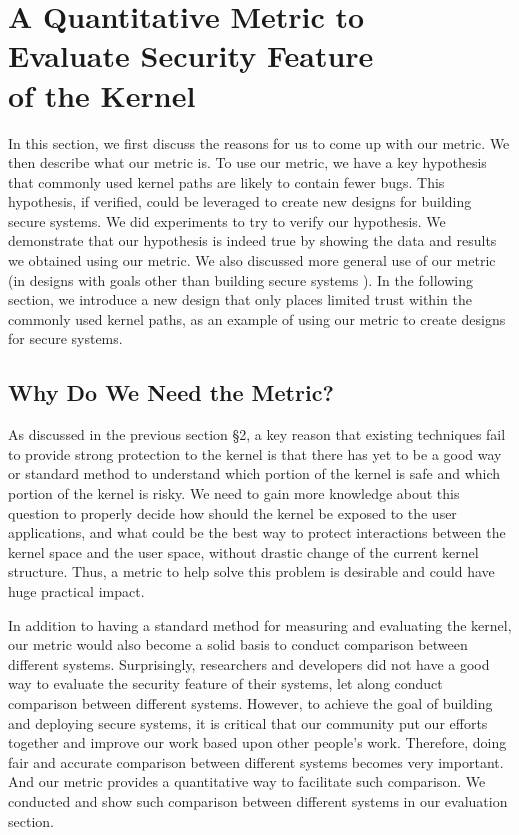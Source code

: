 \section{A Quantitative Metric to \\ Evaluate Security Feature \\ of the Kernel}
\label{sec.metric}
In this section, we first discuss the reasons for us to come up with our metric. 
We then describe what our metric is. To use our metric, we have a key hypothesis that 
commonly used kernel paths are likely to contain fewer bugs. This hypothesis, if verified, 
could be leveraged to create new designs for building secure systems. We did experiments 
to try to verify our hypothesis. We demonstrate that our hypothesis is indeed true by showing 
the data and results we obtained using our metric. We also discussed more general use of 
our metric (in designs with goals other than building secure systems ).
In the following section, we introduce a new design that only places limited trust within 
the commonly used kernel paths, as an example of using our metric to create designs 
for secure systems.

\subsection{Why Do We Need the Metric?}
As discussed in the previous section \S{2}, a key reason that existing techniques 
fail to provide strong protection to the kernel is that there has yet to be a good way 
or standard method to understand which portion of the kernel is safe 
and which portion of the kernel is risky. We need to gain more knowledge about 
this question to properly decide how should the kernel be exposed to the user applications, 
and what could be the best way to protect interactions between the kernel space and 
the user space, without drastic change of the 
current kernel structure. Thus, a metric to help solve this problem is desirable 
and could have huge practical impact. 

In addition to having a standard method for measuring and evaluating the kernel, 
our metric would also become a solid basis to conduct comparison between different systems. 
Surprisingly, researchers and developers did not have a good way to evaluate the security feature 
of their systems, let along conduct comparison between different systems. However, to achieve the 
goal of building and deploying secure systems, it is critical that our community put our efforts together 
and improve our work based upon other people's work. Therefore, doing fair and accurate comparison 
between different systems becomes very important. And our metric provides a quantitative way to 
facilitate such comparison. We conducted and show such comparison between different systems in 
our evaluation section. 

